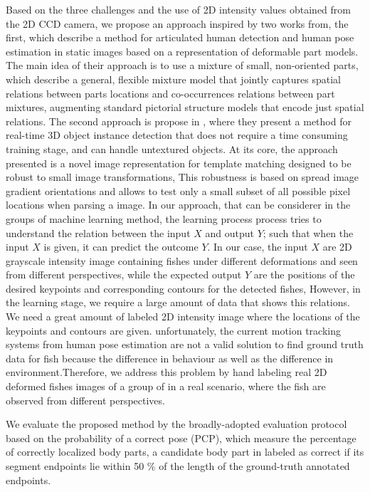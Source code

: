 Based on the three challenges and the use of 2D intensity values obtained from the
2D CCD camera, we propose an approach inspired by two works from, the first, 
\citet{ramanan2012} which describe a method for articulated human detection
and human pose estimation in static images based on a representation of deformable 
part models. The main idea of their approach is to use a mixture of small, non-oriented 
parts, which describe a general, flexible mixture model that jointly captures spatial 
relations between parts locations and co-occurrences relations between part mixtures, 
augmenting standard pictorial structure models that encode just spatial relations. 
The second approach is propose in \citet{Hinterstoisser2012}, where they present 
a method for real-time 3D object instance detection that does not require a time 
consuming training stage, and can handle untextured objects. At its core, the approach 
presented is a novel image representation for template matching designed to be robust 
to small image transformations, This robustness is based on spread image gradient 
orientations and allows to test only a small subset of all possible pixel locations 
when parsing a image.
In our approach, that can be considerer in the groups of machine learning method, 
the learning process process tries to understand the relation between the input $X$
and output $Y$; such that when the input $X$ is given, it can predict the outcome $Y$.
In our case, the input $X$ are 2D grayscale intensity image containing fishes under
different deformations and seen from different perspectives, while the expected output
$Y$ are the positions of the desired keypoints and corresponding contours for the detected
fishes, However, in the learning stage, we require a large amount of data that shows
this relations. We need a great amount of labeled 2D intensity image where the locations
of the keypoints and contours are given. unfortunately, the current motion tracking systems
from human pose estimation are not a valid solution to find ground truth data for fish
because the difference in behaviour as well as the difference in environment.Therefore,
we address this problem by hand labeling real 2D deformed fishes images of a group of in a real
scenario, where the fish are observed from different perspectives.



We evaluate the proposed method by the broadly-adopted evaluation protocol based on the probability of 
a correct pose (PCP), which measure the percentage of correctly localized body parts, 
a candidate body part in labeled as correct if its segment endpoints lie within 50 \% of the length
of the ground-truth annotated endpoints.


